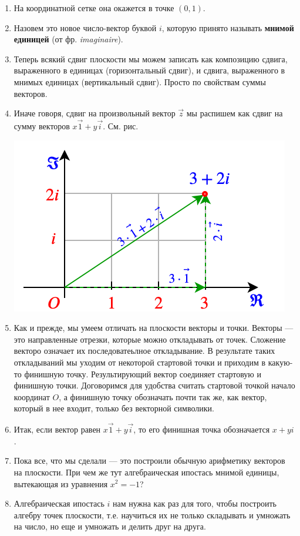 \begin{enumerate}
\item На координатной сетке она окажется в точке $(0,1)$.
\item Назовем это новое число-вектор буквой $i$,  которую принято называть \textbf{мнимой единицей} (от фр. \textit{imaginaire}).
\item Теперь всякий сдвиг плоскости мы можем записать как композицию сдвига, выраженного в единицах (горизонтальный сдвиг), и сдвига, выраженного в мнимых единицах (вертикальный сдвиг). Просто по свойствам суммы векторов.
\item Иначе говоря, сдвиг на произвольный вектор $\vec z$ мы распишем как сдвиг на сумму векторов $x\vec 1+y\vec i$. См. рис.
\begin{center}
\includegraphics[scale=0.5]{complex.png}
\end{center}
\item Как и прежде, мы умеем отличать на плоскости векторы и точки. Векторы --- это направленные отрезки, которые можно откладывать от точек. Сложение векторо означает их последоватеьлное откладывание. В результате таких откладываний мы уходим от некоторой стартовой точки и приходим в какую-то финишную точку. Результирующий вектор соединяет стартовую и финишную точки. Договоримся для удобства считать стартовой точкой начало координат $O$, а финишную точку обозначать почти так же, как вектор, который в нее входит, только без векторной символики.
\item Итак, если вектор равен $x\vec 1+y\vec i$, то его финишная точка обозначается $x+yi$.
\item Пока все, что мы сделали --- это построили обычную арифметику векторов на плоскости. При чем же тут алгебраическая ипостась мнимой единицы, вытекающая из уравнения $x^2=-1$?
\item Алгебраическая ипостась $i$ нам нужна как раз для того, чтобы построить алгебру точек плоскости, т.е. научиться их не только складывать и умножать на число, но еще и умножать и делить друг на друга.

\end{enumerate}
